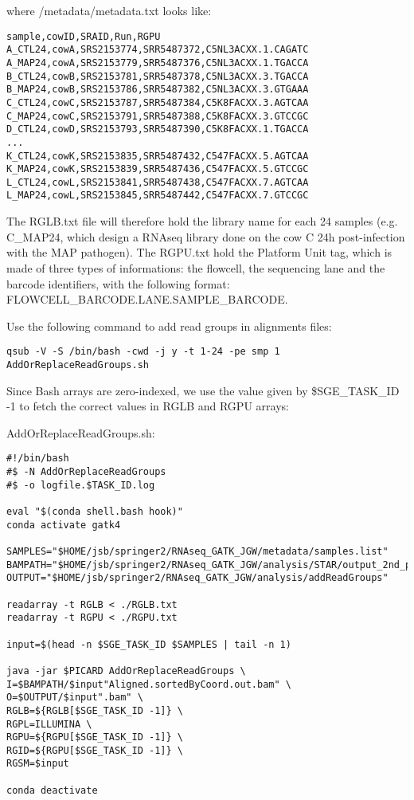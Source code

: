 where /metadata/metadata.txt looks like:

\begin{verbatim}
sample,cowID,SRAID,Run,RGPU
A_CTL24,cowA,SRS2153774,SRR5487372,C5NL3ACXX.1.CAGATC
A_MAP24,cowA,SRS2153779,SRR5487376,C5NL3ACXX.1.TGACCA
B_CTL24,cowB,SRS2153781,SRR5487378,C5NL3ACXX.3.TGACCA
B_MAP24,cowB,SRS2153786,SRR5487382,C5NL3ACXX.3.GTGAAA
C_CTL24,cowC,SRS2153787,SRR5487384,C5K8FACXX.3.AGTCAA
C_MAP24,cowC,SRS2153791,SRR5487388,C5K8FACXX.3.GTCCGC
D_CTL24,cowD,SRS2153793,SRR5487390,C5K8FACXX.1.TGACCA
...
K_CTL24,cowK,SRS2153835,SRR5487432,C547FACXX.5.AGTCAA
K_MAP24,cowK,SRS2153839,SRR5487436,C547FACXX.5.GTCCGC
L_CTL24,cowL,SRS2153841,SRR5487438,C547FACXX.7.AGTCAA
L_MAP24,cowL,SRS2153845,SRR5487442,C547FACXX.7.GTCCGC
\end{verbatim}


The RGLB.txt file will therefore hold the library name for each 24 samples (e.g. C\_MAP24, which design a RNAseq library done on the cow C 24h post-infection with the MAP pathogen). The RGPU.txt hold the Platform Unit tag, which is made of three types of informations: the flowcell, the sequencing lane and the barcode identifiers, with the following format: {FLOWCELL\_BARCODE}.{LANE}.{SAMPLE\_BARCODE}. 


Use the following command to add read groups in alignments files:

\begin{verbatim}
qsub -V -S /bin/bash -cwd -j y -t 1-24 -pe smp 1 AddOrReplaceReadGroups.sh
\end{verbatim}

Since Bash arrays are zero-indexed, we use the value given by \$SGE\_TASK\_ID -1 to fetch the correct values in RGLB and RGPU arrays:

\noindent AddOrReplaceReadGroups.sh:
\begin{verbatim}
#!/bin/bash
#$ -N AddOrReplaceReadGroups
#$ -o logfile.$TASK_ID.log

eval "$(conda shell.bash hook)"
conda activate gatk4

SAMPLES="$HOME/jsb/springer2/RNAseq_GATK_JGW/metadata/samples.list"
BAMPATH="$HOME/jsb/springer2/RNAseq_GATK_JGW/analysis/STAR/output_2nd_pass"
OUTPUT="$HOME/jsb/springer2/RNAseq_GATK_JGW/analysis/addReadGroups"

readarray -t RGLB < ./RGLB.txt
readarray -t RGPU < ./RGPU.txt

input=$(head -n $SGE_TASK_ID $SAMPLES | tail -n 1)

java -jar $PICARD AddOrReplaceReadGroups \
I=$BAMPATH/$input"Aligned.sortedByCoord.out.bam" \
O=$OUTPUT/$input".bam" \
RGLB=${RGLB[$SGE_TASK_ID -1]} \
RGPL=ILLUMINA \
RGPU=${RGPU[$SGE_TASK_ID -1]} \
RGID=${RGPU[$SGE_TASK_ID -1]} \
RGSM=$input

conda deactivate
\end{verbatim}


